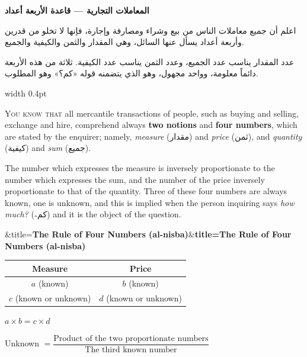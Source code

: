 \documentclass[11pt,a4paper]{book}
\newcommand{\ar}[1]{{\arabicfont\beginR #1\endR}}
\newenvironment{transbox}[1][]{%
  \smallskip\par\noindent
  \begin{lrbox}{\transboxsave}
  \begin{minipage}{\dimexpr\linewidth-2\fboxsep-2\fboxrule\relax}%
  \setlength{\parskip}{0.3em}%
  \ifx&#1&\else\textbf{#1}\\[0.2cm]\fi
}{%
  \end{minipage}%
  \end{lrbox}
  \fcolorbox{rulecolor}{transbg}{\usebox{\transboxsave}}%
  \smallskip}
\begin{document}
\noindent\begin{minipage}[t]{0.48\textwidth}
\raggedleft

\begin{Arabic}
\textbf{المعاملات التجارية — قاعدة الأربعة أعداد}

اعلم أن جميع معاملات الناس من بيع وشراء ومصارفة وإجارة، فإنها لا تخلو من قدرين وأربعة أعداد يسأل عنها السائل، وهي المقدار والثمن والكيفية والجميع.

عدد المقدار يناسب عدد الجميع، وعدد الثمن يناسب عدد الكيفية. ثلاثة من هذه الأربعة دائماً معلومة، وواحد مجهول، وهو الذي يتضمنه قوله «كم؟» وهو المطلوب.
\end{Arabic}

\end{minipage}%
\hfill\vrule width 0.4pt\hfill
\begin{minipage}[t]{0.48\textwidth}
\raggedright

\lettrine[lines=2, lhang=0.33, nindent=0em, findent=3pt, loversize=0.14]{
\textcolor{dropgold}{Y}}{ou know that} all mercantile transactions of people, such as buying and selling, exchange and hire, comprehend always \textbf{two notions} and \textbf{four numbers}, which are stated by the enquirer; namely, \textit{measure} (\ar{مقدار}) and \textit{price} (\ar{ثمن}), and \textit{quantity} (\ar{كيفية}) and \textit{sum} (\ar{جميع}).

The number which expresses the measure is inversely proportionate to the number which expresses the sum, and the number of the price inversely proportionate to that of the quantity. Three of these four numbers are always known, one is unknown, and this is implied when the person inquiring says \textit{how much?} (\ar{كم؞}) and it is the object of the question.

\begin{transbox}[title={\textbf{The Rule of Four Numbers (al-nisba)}}]
\begin{center}
\begin{tabular}{c|c}
\textbf{Measure} & \textbf{Price} \\
\hline
$a$ (known) & $b$ (known) \\
$c$ (known or unknown) & $d$ (known or unknown) \\
\end{tabular}

\vspace{0.2cm}

$a \times b = c \times d$ \quad{}

Unknown $= \dfrac{\text{Product of the two proportionate numbers}}{\text{The third known number}}$
\end{center}
\end{transbox}

\end{minipage}
\vspace{0.3cm}
\end{document}
